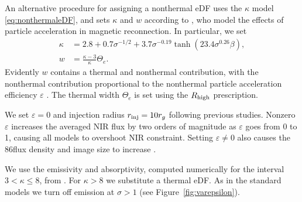 
An alternative procedure for assigning a nonthermal eDF uses the $\kappa$ model \eqref{eq:nonthermaleDF}, and sets $\kappa$ and $w$ according to \cite{2018ApJ...862...80B}, who model the effects of particle acceleration in magnetic reconnection.  In particular, we set
\begin{align}
  \kappa &= 2.8 +0.7\sigma^{-1/2} + 3.7\sigma^{-0.19}\tanh{(23.4\sigma^{0.26}\beta)}, \label{eq:kappa}\\
  w      &= \frac{ \kappa -3 }{\kappa} \Theta_e.
\end{align}
Evidently $w$ contains a thermal and nonthermal contribution, with the nonthermal contribution proportional to the nonthermal particle acceleration efficiency $\varepsilon$  \citep{2019A&A...632A...2D, 2021NatAs.tmp..218C}.  The thermal width $\Theta_e$ is set using the $R_\mathrm{high}$ prescription.

We set $\varepsilon=0$ and injection radius $r_{\rm inj}=10r_{g}$ following previous studies.  Nonzero $\varepsilon$ increases the averaged NIR flux by two orders of magnitude as $\varepsilon$ goes from 0 to 1, causing all models to overshoot NIR constraint.  Setting $\varepsilon \ne 0$ also causes the 86\GHz flux density and image size to increase \citep{2021arXiv211102518F}.

We use the emissivity and absorptivity, computed numerically for the interval $3 < \kappa \le 8$, from  \cite{2016ApJ...822...34P}. For $\kappa > 8$ we substitute a thermal eDF.  As in the standard models we turn off emission at $\sigma > 1$ (see Figure~\ref{fig:varepsilon}).

